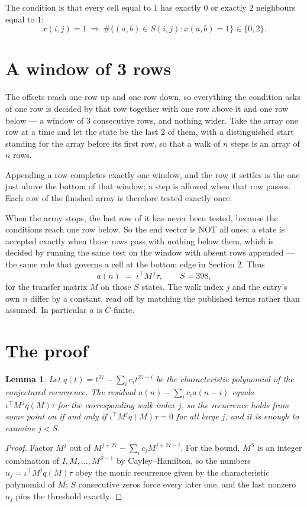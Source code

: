 \documentclass[11pt,a4paper]{article}
\theoremstyle{plain}
\newtheorem{lemma}[theorem]{Lemma}
\theoremstyle{definition}
\begin{document}
The condition is that every cell equal to $1$ has exactly $0$ or exactly $2$ neighbours equal to $1$:
\[
x(i,j)=1\ \Longrightarrow\ \#\{(a,b)\in S(i,j):x(a,b)=1\}\in\{0,2\}.
\]


\section{A window of 3 rows}

The offsets reach one row up and one row down, so everything the condition asks of one row is
decided by that row together with one row above it and one row below --- a window of
$3$ consecutive rows, and nothing wider. Take the array one row at a time and
let the state be the last 2 of them, with a distinguished start standing for the array before its
first row, so that a walk of $n$ steps is an array of $n$ rows.

Appending a row completes exactly one window, and the row it settles is the one just above the bottom of that window; a step is
allowed when that row passes. Each row of the finished array is therefore tested exactly once.

When the array stops, the last row of it has never been tested, because the
conditions reach one row below. So the end vector is NOT all ones: a state is accepted exactly when
those rows pass with nothing below them, which is decided by running the same test on the window
with absent rows appended --- the same rule that governs a cell at the bottom edge in
Section 2.
Thus
\[
a(n)\;=\;\iota^{\!\top}M^{\,j}\tau ,\qquad S=398,
\]
for the transfer matrix $M$ on those $S$ states. The walk index $j$ and the entry's own $n$
differ by a constant, read off by matching the published terms rather than assumed. In
particular $a$ is $C$-finite.

\section{The proof}

\begin{lemma}\label{lem:crit}
Let $q(t)=t^{27}-\sum_i c_it^{27-i}$ be the characteristic polynomial of the
conjectured recurrence. The residual $a(n)-\sum_ic_ia(n-i)$ equals
$\iota^{\!\top}M^{\,j}q(M)\tau$ for the corresponding walk index $j$, so the recurrence
holds from some point on if and only if $\iota^{\!\top}M^{j}q(M)\tau=0$ for all large $j$,
and it is enough to examine $j<S$.
\end{lemma}

\begin{proof}
Factor $M^{j}$ out of $M^{j+27}-\sum_ic_iM^{j+27-i}$. For the bound, $M^{S}$
is an integer combination of $I,M,\dots,M^{S-1}$ by Cayley--Hamilton, so the numbers
$u_j=\iota^{\!\top}M^{j}q(M)\tau$ obey the monic recurrence given by the characteristic
polynomial of $M$; $S$ consecutive zeros force every later one, and the last nonzero $u_j$
pins the threshold exactly.
\end{proof}
\end{document}
